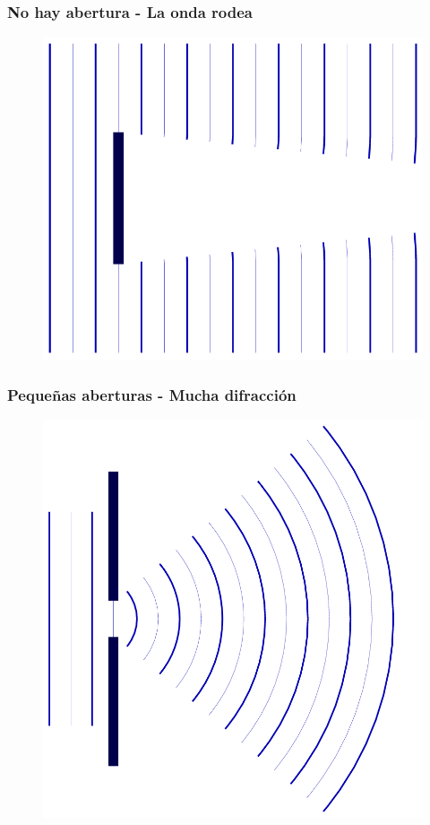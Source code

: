 \documentclass[14pt]{beamer}
\begin{document}
\begin{frame}
\frametitle{No hay abertura - La onda rodea}
\begin{figure}
    \centering
    \includegraphics[scale=0.25]{Imagenes/Difraccion_Patrones_02.png}
\end{figure}
\end{frame}
\begin{frame}
\frametitle{Pequeñas aberturas - Mucha difracción}
\begin{figure}
    \centering
    \includegraphics[scale=0.15]{Imagenes/Difraccion_Patrones_03.png}
\end{figure}
\end{frame}
\end{document}
